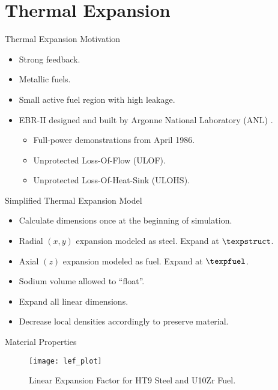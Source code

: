 \section{Thermal Expansion}
\label{sec:thermalExpansion}

\begin{frame}{Thermal Expansion Motivation}
  \begin{itemize}
    \item Strong feedback.
    \item Metallic fuels.
    \item Small active fuel region with high leakage.
    \item EBR-II designed and built by Argonne National Laboratory (ANL)
      \cite{PlentifulEnergy}.
      \begin{itemize}
        \item Full-power demonstrations from April 1986.
        \item Unprotected Loss-Of-Flow (ULOF).
        \item Unprotected Loss-Of-Heat-Sink (ULOHS).
      \end{itemize}
  \end{itemize}
\end{frame}

\begin{frame}{Simplified Thermal Expansion Model}
  \begin{itemize}
    \item Calculate dimensions once at the beginning of simulation.
    \item Radial $(x,y)$ expansion modeled as steel. Expand at $\texpstruct$.
    \item Axial $(z)$ expansion modeled as fuel. Expand at $\texpfuel$.
    \item Sodium volume allowed to ``float''.
    \item Expand all linear dimensions.
    \item Decrease local densities accordingly to preserve material.
  \end{itemize}
\end{frame}

\begin{frame}{Material Properties}
  \begin{figure}
    \centering
    \texttt{[image: lef\_plot]}
    \caption{Linear Expansion Factor for HT9 Steel and U10Zr Fuel.}
    \label{fig:lef_plot}
  \end{figure}
\end{frame}

